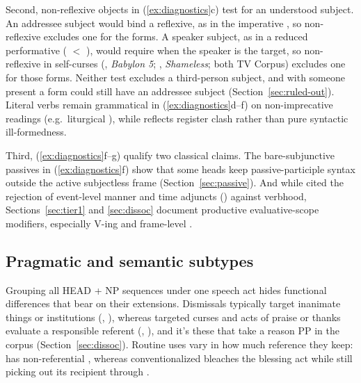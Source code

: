\documentclass[12pt]{article}
\begin{document}
Second, non-reflexive objects in (\ref{ex:diagnostics}c) test for an understood subject. An addressee subject would bind a reflexive, as in the imperative  \citep[3]{quang1971,pinker2007,portner2026}, so non-reflexive  excludes one for the  forms. A speaker subject, as in a reduced performative ( $<$ ), would require  when the speaker is the target, so non-reflexive  in self-curses (, \emph{Babylon 5}; , \emph{Shameless}; both TV Corpus) excludes one for those forms. Neither test excludes a third-person subject, and with someone present a  form could still have an addressee subject (Section~\ref{sec:ruled-out}). Literal verbs remain grammatical in (\ref{ex:diagnostics}d--f) on non-imprecative readings (e.g.\ liturgical ), while  reflects register clash rather than pure syntactic ill-formedness.

Third, (\ref{ex:diagnostics}f--g) qualify two classical claims. The bare-subjunctive passives in (\ref{ex:diagnostics}f) show that some heads keep passive-participle syntax outside the active subjectless frame (Section~\ref{sec:passive}). And while \textcite[5--6]{quang1971} cited the rejection of event-level manner and time adjuncts () against verbhood, Sections~\ref{sec:tier1} and \ref{sec:dissoc} document productive evaluative-scope modifiers, especially  V-ing and frame-level .

\subsection{Pragmatic and semantic subtypes}
\label{sec:subtypes}

Grouping all HEAD + NP sequences under one speech act hides functional differences that bear on their extensions. Dismissals typically target inanimate things or institutions (, ), whereas targeted curses and acts of praise or thanks evaluate a responsible referent (, ), and it's these that take a reason PP in the corpus (Section~\ref{sec:dissoc}). Routine uses vary in how much reference they keep:  has non-referential , whereas conventionalized  bleaches the blessing act while still picking out its recipient through .
\end{document}
